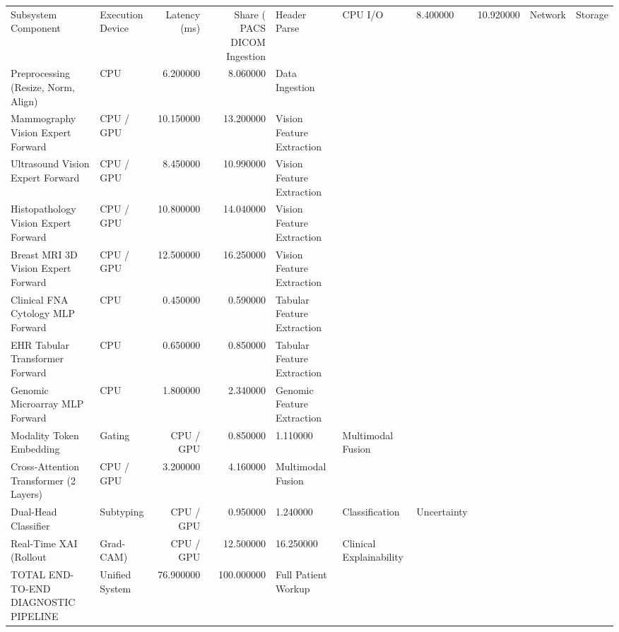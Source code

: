 \begin{tabular}{llrrl}
\toprule
Subsystem Component & Execution Device & Latency (ms) & Share (%
\midrule
PACS DICOM Ingestion & Header Parse & CPU I/O & 8.400000 & 10.920000 & Network & Storage \\
Preprocessing (Resize, Norm, Align) & CPU & 6.200000 & 8.060000 & Data Ingestion \\
Mammography Vision Expert Forward & CPU / GPU & 10.150000 & 13.200000 & Vision Feature Extraction \\
Ultrasound Vision Expert Forward & CPU / GPU & 8.450000 & 10.990000 & Vision Feature Extraction \\
Histopathology Vision Expert Forward & CPU / GPU & 10.800000 & 14.040000 & Vision Feature Extraction \\
Breast MRI 3D Vision Expert Forward & CPU / GPU & 12.500000 & 16.250000 & Vision Feature Extraction \\
Clinical FNA Cytology MLP Forward & CPU & 0.450000 & 0.590000 & Tabular Feature Extraction \\
EHR Tabular Transformer Forward & CPU & 0.650000 & 0.850000 & Tabular Feature Extraction \\
Genomic Microarray MLP Forward & CPU & 1.800000 & 2.340000 & Genomic Feature Extraction \\
Modality Token Embedding & Gating & CPU / GPU & 0.850000 & 1.110000 & Multimodal Fusion \\
Cross-Attention Transformer (2 Layers) & CPU / GPU & 3.200000 & 4.160000 & Multimodal Fusion \\
Dual-Head Classifier & Subtyping & CPU / GPU & 0.950000 & 1.240000 & Classification & Uncertainty \\
Real-Time XAI (Rollout & Grad-CAM) & CPU / GPU & 12.500000 & 16.250000 & Clinical Explainability \\
TOTAL END-TO-END DIAGNOSTIC PIPELINE & Unified System & 76.900000 & 100.000000 & Full Patient Workup \\
\bottomrule
\end{tabular}

